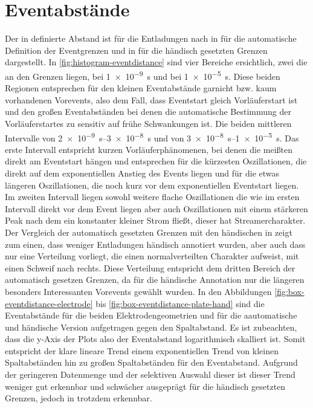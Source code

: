 \section{Eventabstände}
\label{sec:eventdistance}

Der in  definierte Abstand ist für die Entladungen nach  in  für die automatische Definition der Eventgrenzen und in  für die händisch gesetzten Grenzen dargestellt. In \ref{fig:histogram-eventdistance} sind vier Bereiche ersichtlich, zwei die an den Grenzen liegen, bei \SI{1e-9}{\second} und bei \SI{1e-5}{\second}. Diese beiden Regionen entsprechen für den kleinen Eventabstände garnicht bzw. kaum vorhandenen Vorevents, also dem Fall, dass Eventstart gleich Vorläuferstart ist und den großen Eventabständen bei denen die automatische Bestimmung der Vorläuferstartes zu sensitiv auf frühe Schwankungen ist. Die beiden mittleren Intervalle von \SIrange{2e-9}{3e-8}{\second} und von \SIrange{3e-8}{1e-5}{\second}. Das erste Intervall entspricht kurzen Vorläuferphänomenen, bei denen die meißten direkt am Eventstart hängen und entsprechen für die kürzesten Oszillationen, die direkt auf dem exponentiellen Anstieg des Events liegen und für die etwas längeren Oszillationen, die noch kurz vor dem exponentiellen Eventstart liegen. Im zweiten Intervall liegen sowohl weitere flache Oszillationen die wie im ersten Intervall direkt vor dem Event liegen aber auch Oszillationen mit einem stärkeren Peak nach dem ein konstanter kleiner Strom fließt, dieser hat Streamercharakter. Der Vergleich der automatisch gesetzten Grenzen mit den händischen in  zeigt zum einen, dass weniger Entladungen händisch annotiert wurden, aber auch dass nur eine Verteilung vorliegt, die einen normalverteilten Charakter aufweist, mit einen Schweif nach rechts. Diese Verteilung entspricht dem dritten Bereich der automatisch gesetzen Grenzen, da für die händische Annotation nur die längeren besonders Interessanten Vorevents gewählt wurden. In den Abbildungen \ref{fig:box-eventdistance-electrode} bis \ref{fig:box-eventdistance-plate-hand} sind die Eventabstände für die beiden Elektrodengeometrien und für die aautomatische und händische Version aufgetragen gegen den Spaltabstand. Es ist zubeachten, dass die y-Axis der Plots also der Eventabstand logarithmisch skalliert ist. Somit entspricht der klare lineare Trend einem exponentiellen Trend von kleinen Spaltabständen hin zu großen Spaltabständen für den Eventabstand. Aufgrund der geringeren Datenmenge und der selektiven Auswahl dieser ist dieser Trend weniger gut erkennbar und schwächer ausgeprägt für die händisch gesetzten Grenzen, jedoch in  trotzdem erkennbar.







